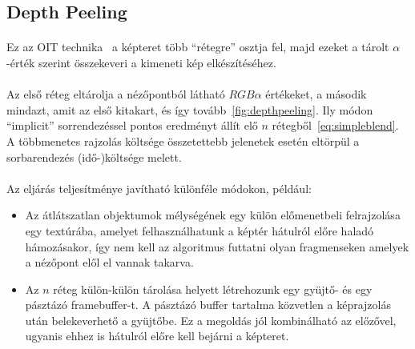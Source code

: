 \subsection{Depth Peeling}
\paragraph{}Ez az \ac{OIT} technika~\cite{Everitt01interactiveorder-independent} a képteret több ``rétegre'' osztja fel, majd ezeket a tárolt $\alpha$-érték szerint összekeveri a kimeneti kép elkészítéséhez.
\paragraph{}Az első réteg eltárolja a nézőpontból látható $RGB\alpha$ értékeket, a második mindazt, amit az első kitakart, és így tovább~\autoref{fig:depthpeeling}. Ily módon ``implicit'' sorrendezéssel pontos eredményt állít elő $n$ rétegből~\ref{eq:simpleblend}. A többmenetes rajzolás költsége összetettebb jelenetek esetén eltörpül a sorbarendezés (idő-)költsége melett.
\paragraph{}Az eljárás teljesítménye javítható különféle módokon, például:
\begin{itemize}
	\label{list:depthpeelvariants}
	\item Az átlátszatlan objektumok mélységének egy külön előmenetbeli felrajzolása egy textúrába, amelyet felhasználhatunk a képtér hátulról előre haladó hámozásakor, így nem kell az algoritmus futtatni olyan fragmenseken amelyek a nézőpont elől el vannak takarva.
	\item Az $n$ réteg külön-külön tárolása helyett létrehozunk egy gyüjtő- és egy pásztázó framebuffer-t. A pásztázó buffer tartalma közvetlen a képrajzolás után belekeverhető a gyüjtőbe. Ez a megoldás jól kombinálható az előzővel, ugyanis ehhez is hátulról előre kell bejárni a képteret.
\end{itemize}

